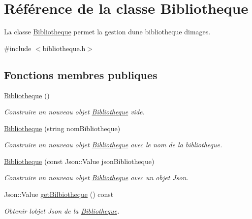 \hypertarget{classBibliotheque}{}\section{Référence de la classe Bibliotheque}
\label{classBibliotheque}


La classe \hyperlink{classBibliotheque}{Bibliotheque} permet la gestion d\textquotesingle{}une bibliotheque d\textquotesingle{}images.  




{\ttfamily \#include $<$bibliotheque.\+h$>$}

\subsection*{Fonctions membres publiques}
\begin{DoxyCompactItemize}
\item 
\mbox{\label{classBibliotheque_a2b1ff298331a04c425926881e5f5ea49}} 
\hyperlink{classBibliotheque_a2b1ff298331a04c425926881e5f5ea49}{Bibliotheque} ()
\begin{DoxyCompactList}\small\item\em Construire un nouveau objet \hyperlink{classBibliotheque}{Bibliotheque} vide. \end{DoxyCompactList}\item 
\hyperlink{classBibliotheque_ac18f721f99ed6699547099e554af08fe}{Bibliotheque} (string nom\+Bibliotheque)
\begin{DoxyCompactList}\small\item\em Construire un nouveau objet \hyperlink{classBibliotheque}{Bibliotheque} avec le nom de la bibliotheque. \end{DoxyCompactList}\item 
\hyperlink{classBibliotheque_abeef5fed51f37a993d77ba5af478051c}{Bibliotheque} (const Json\+::\+Value json\+Bibliotheque)
\begin{DoxyCompactList}\small\item\em Construire un nouveau objet \hyperlink{classBibliotheque}{Bibliotheque} avec un objet Json. \end{DoxyCompactList}\item 
Json\+::\+Value \hyperlink{classBibliotheque_a24b9cdc62d7bf2628e13ac9049dccaf3}{get\+Bilbiotheque} () const
\begin{DoxyCompactList}\small\item\em Obtenir l\textquotesingle{}objet Json de la \hyperlink{classBibliotheque}{Bibliotheque}. \end{DoxyCompactList}\item 

\end{DoxyCompactItemize}
